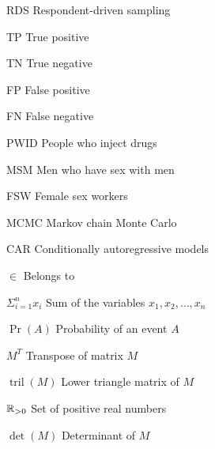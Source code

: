 \begin{siglas}
    \item[RDS] Respondent-driven sampling
    \item[TP] True positive 
    \item[TN] True negative
    \item[FP] False positive
    \item[FN] False negative
    \item[PWID] People who inject drugs
    \item[MSM] Men who have sex with men
    \item[FSW] Female sex workers      
    \item[MCMC] Markov chain Monte Carlo 
    \item[CAR] Conditionally autoregressive models
  \end{siglas}
  
  \begin{simbolos}
    \item[$\in$] Belongs to 
    \item[$\Sigma_{i=1}^n x_i$] Sum of the variables $x_1, x_2, \dots, x_n$
    \item[$\Pr(A)$] Probability of an event $A$
    \item[$M^T$] Transpose of matrix $M$
    \item[$\operatorname{tril}(M)$] Lower triangle matrix of $M$
    \item[$\mathbb{R}_{>0}$] Set of positive real numbers
    \item[$\det(M)$] Determinant of $M$ 
  \end{simbolos}